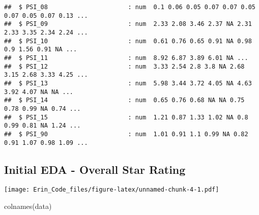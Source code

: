 \documentclass[
]{article}
\newenvironment{Shaded}{\begin{snugshade}}{\end{snugshade}}
\newcommand{\CommentTok}[1]{\textcolor[rgb]{0.56,0.35,0.01}{\textit{#1}}}
\newcommand{\FunctionTok}[1]{\textcolor[rgb]{0.00,0.00,0.00}{#1}}
\newcommand{\NormalTok}[1]{#1}
\newcommand{\SpecialCharTok}[1]{\textcolor[rgb]{0.00,0.00,0.00}{#1}}
\begin{document}
\begin{verbatim}
##  $ PSI_08                      : num  0.1 0.06 0.05 0.07 0.07 0.05 0.07 0.05 0.07 0.13 ...
##  $ PSI_09                      : num  2.33 2.08 3.46 2.37 NA 2.31 2.33 3.35 2.34 2.24 ...
##  $ PSI_10                      : num  0.61 0.76 0.65 0.91 NA 0.98 0.9 1.56 0.91 NA ...
##  $ PSI_11                      : num  8.92 6.87 3.89 6.01 NA ...
##  $ PSI_12                      : num  3.33 2.54 2.8 3.8 NA 2.68 3.15 2.68 3.33 4.25 ...
##  $ PSI_13                      : num  5.98 3.44 3.72 4.05 NA 4.63 3.92 4.07 NA NA ...
##  $ PSI_14                      : num  0.65 0.76 0.68 NA NA 0.75 0.78 0.99 NA 0.74 ...
##  $ PSI_15                      : num  1.21 0.87 1.33 1.02 NA 0.8 0.99 0.81 NA 1.24 ...
##  $ PSI_90                      : num  1.01 0.91 1.1 0.99 NA 0.82 0.91 1.07 0.98 1.09 ...
\end{verbatim}

\hypertarget{initial-eda---overall-star-rating}{%
\subsection{Initial EDA - Overall Star
Rating}\label{initial-eda---overall-star-rating}}

\begin{Shaded}
\end{Shaded}

\texttt{[image: Erin\_Code\_files/figure-latex/unnamed-chunk-4-1.pdf]}

\begin{Shaded}
\begin{Highlighting}[]
\FunctionTok{colnames}\NormalTok{(data)}
\end{Highlighting}
\end{Shaded}
\end{document}
